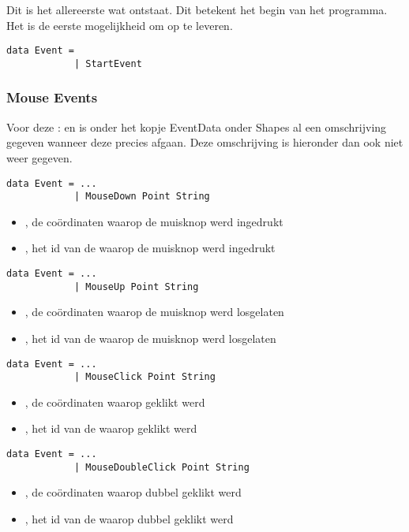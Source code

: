 Dit is het allereerste  wat ontstaat. Dit  betekent het begin van het programma. Het is de eerste mogelijkheid om  op te leveren.
\begin{lstlisting}
data Event = 
			| StartEvent
\end{lstlisting}

\subsubsection{Mouse Events}
Voor deze \events:  en  is onder het kopje EventData onder Shapes al een omschrijving gegeven wanneer deze precies afgaan. Deze omschrijving is hieronder dan ook niet weer gegeven.

\begin{lstlisting}
data Event = ...
			| MouseDown Point String
\end{lstlisting}
\begin{itemize}
	\item {}, de coördinaten waarop de muisknop werd ingedrukt
	\item {}, het id van de \shape waarop de muisknop werd ingedrukt
\end{itemize}

\begin{lstlisting}
data Event = ...
			| MouseUp Point String
\end{lstlisting}
\begin{itemize}
	\item {}, de coördinaten waarop de muisknop werd losgelaten
	\item {}, het id van de \shape waarop de muisknop werd losgelaten
\end{itemize}

\begin{lstlisting}
data Event = ...
			| MouseClick Point String
\end{lstlisting}
\begin{itemize}
	\item {}, de coördinaten waarop geklikt werd
	\item {}, het id van de \shape waarop geklikt werd
\end{itemize}

\begin{lstlisting}
data Event = ...
			| MouseDoubleClick Point String
\end{lstlisting}
\begin{itemize}
	\item {}, de coördinaten waarop dubbel geklikt werd
	\item {}, het id van de \shape waarop dubbel geklikt werd
\end{itemize}

